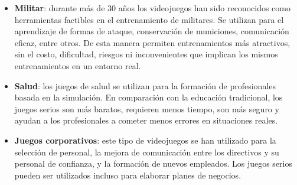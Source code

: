 \begin{itemize}

\item \textbf{Militar}: durante más de $30$ años los videojuegos han sido
    reconocidos como herramientas factibles en el entrenamiento de militares. Se
    utilizan para el aprendizaje de formas de ataque, conservación de
    municiones, comunicación eficaz, entre otros.  De esta manera permiten
    entrenamientos más atractivos, sin el costo, dificultad, riesgos ni
    inconvenientes que implican los mismos entrenamientos en un entorno
    real\cite{education:games}.

\item \textbf{Salud}: los juegos de salud se utilizan para la formación de
    profesionales basada en la simulación. En comparación con la educación
    tradicional, los juegos serios son más baratos, requieren menos tiempo, son
    más seguro y ayudan a los profesionales a cometer menos errores en
    situaciones reales\cite{education:games}. 

\item \textbf{Juegos corporativos}: este tipo de videojuegos se han utilizado
    para la selección de personal, la mejora de comunicación entre los
    directivos y su personal de confianza, y la formación de nuevos empleados.
    Los juegos serios pueden ser utilizados incluso para elaborar planes de
    negocios\cite{education:games}. 

\end{itemize}

